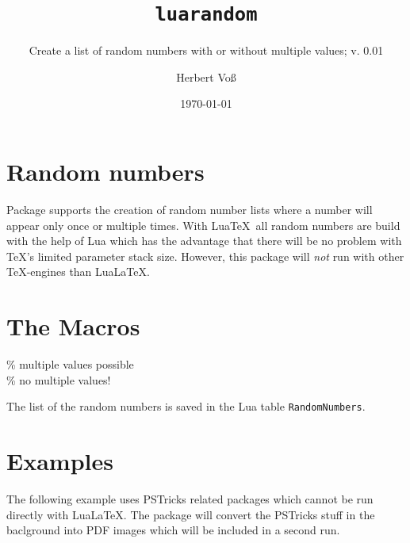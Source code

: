 \documentclass[fontsize=11pt,english,BCOR=10mm,DIV=12,bibliography=totoc,parskip=false,
   headings=small, headinclude=false,footinclude=false,oneside,abstract=on]{pst-doc}
\begin{document}
\title{\texttt{luarandom}}
\subtitle{Create a list of random numbers with or without multiple values; v. 0.01}
\author{Herbert Vo\ss}
\date{\today}
\maketitle

\tableofcontents


\section{Random numbers}
Package  supports the creation of random number lists where a number will
appear only once or multiple times. With Lua\TeX\ all random numbers are build with the help of Lua which
has the advantage that there will be no problem with \TeX's limited parameter stack size.
However, this package will \emph{not}  run with other \TeX-engines than Lua\LaTeX.


\section{The Macros}
\begin{BDef}
\% multiple values possible\\
 \% no multiple values!\\
\end{BDef}


The list of the random numbers is saved in the Lua table \texttt{RandomNumbers}. 


\section{Examples}


\begin{LTXexample}[pos=t]
\small
{}%

\end{LTXexample}



The following example uses PSTricks related packages which cannot be run directly 
with Lua\LaTeX. The package  will convert the PSTricks stuff
in the baclground into PDF images which will be included in a second run.
\end{document}
